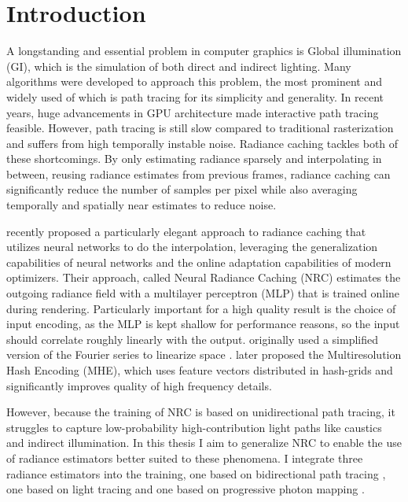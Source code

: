 
\chapter{Introduction}
\label{chap:intro}

A longstanding and essential problem in computer graphics is Global illumination (GI), which is the simulation of both direct and indirect lighting.
Many algorithms were developed to approach this problem, the most prominent and widely used of which is path tracing \parencite{kajiya1986} for its simplicity and generality.
In recent years, huge advancements in GPU architecture made interactive path tracing feasible.
However, path tracing is still slow compared to traditional rasterization and suffers from high temporally instable noise.
Radiance caching \parencite{ward1988} tackles both of these shortcomings.
By only estimating radiance sparsely and interpolating in between, reusing radiance estimates from previous frames, radiance caching can significantly reduce the number of samples per pixel while also averaging temporally and spatially near estimates to reduce noise.

\textcite{muller2021} recently proposed a particularly elegant approach to radiance caching that utilizes neural networks to do the interpolation, leveraging the generalization capabilities of neural networks and the online adaptation capabilities of modern optimizers.
Their approach, called Neural Radiance Caching (NRC) estimates the outgoing radiance field with a multilayer perceptron (MLP) that is trained online during rendering.
Particularly important for a high quality result is the choice of input encoding, as the MLP is kept shallow for performance reasons, so the input should correlate roughly linearly with the output.
\textcite{muller2021} originally used a simplified version of the Fourier series to linearize space \parencite{tancik2020}.
\textcite{muller2022} later proposed the Multiresolution Hash Encoding (MHE), which uses feature vectors distributed in hash-grids and significantly improves quality of high frequency details.

However, because the training of NRC is based on unidirectional path tracing, it struggles to capture low-probability high-contribution light paths like caustics and indirect illumination.
In this thesis I aim to generalize NRC to enable the use of radiance estimators better suited to these phenomena.
I integrate three radiance estimators into the training, one based on bidirectional path tracing \parencite{lafortune1993}, one based on light tracing \parencite{arvo1986} and one based on progressive photon mapping \parencite{hachisuka2008}.

